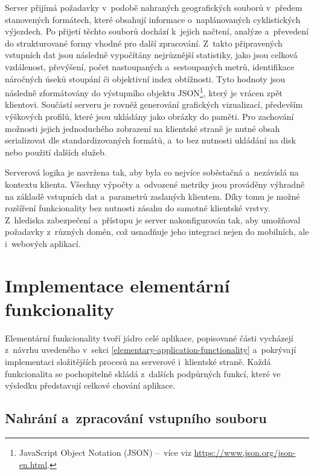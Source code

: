 Server přijímá požadavky v~podobě nahraných geografických souborů v~předem stanovených formátech, které obsahují informace o~naplánovaných cyklistických výjezdech.
Po přijetí těchto souborů dochází k~jejich načtení, analýze a~převedení do strukturované formy vhodné pro další zpracování.
Z~takto připravených vstupních dat jsou následně vypočítány nejrůznější statistiky, jako jsou celková vzdálenost, převýšení, počet nastoupaných a~sestoupaných metrů, identifikace náročných úseků stoupání či objektivní index obtížnosti.
Tyto hodnoty jsou následně zformátovány do výstupního objektu JSON\footnote{JavaScript Object Notation (JSON) --~více viz \url{https://www.json.org/json-en.html}.}, který je vrácen zpět klientovi.
Součástí serveru je rovněž generování grafických vizualizací, především výškových profilů, které jsou ukládány jako obrázky do paměti.
Pro zachování možnosti jejich jednoduchého zobrazení na klientské straně je nutné obsah serializovat dle standardizovaných formátů, a~to bez nutnosti ukládání na disk nebo použití dalších služeb.

Serverová logika je navržena tak, aby byla co nejvíce soběstačná a~nezávislá na kontextu klienta.
Všechny výpočty a~odvozené metriky jsou prováděny výhradně na základě vstupních dat a~parametrů zaslaných klientem.
Díky tomu je možné rozšíření funkcionality bez nutnosti zásahu do samotné klientské vrstvy.
Z~hlediska zabezpečení a~přístupu je server nakonfigurován tak, aby umožňoval požadavky z~různých domén, což usnadňuje jeho integraci nejen do mobilních, ale i~webových aplikací.

\section{Implementace elementární funkcionality}
\label{implementation-of-elementary-functionalities}

Elementární funkcionality tvoří jádro celé aplikace, popisované části vycházejí z~návrhu uvedeného v~sekci \ref{elementary-application-functionality} a~pokrývají implementaci složitějších procesů na serverové i~klientské straně.
Každá funkcionalita se pochopitelně skládá z~dalších podpůrných funkcí, které ve výsledku představují celkové chování aplikace.

\subsection{Nahrání a~zpracování vstupního souboru}
\label{uploading-and-processing-input-files}

